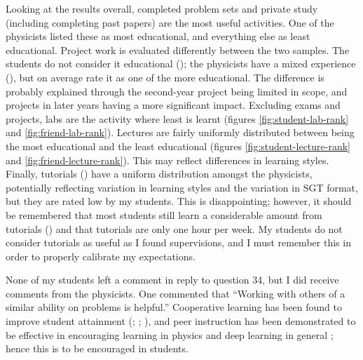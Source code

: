 Looking at the results overall, completed problem sets and private study (including completing past papers) are the most useful activities. One of the physicists listed these as most educational, and everything else as least educational. Project work is evaluated differently between the two samples. The students do not consider it educational (); the physicists have a mixed experience (), but on average rate it as one of the more educational. The difference is probably explained through the second-year project being limited in scope, and projects in later years having a more significant impact. Excluding exams and projects, labs are the activity where least is learnt (figures \ref{fig:student-lab-rank} and \ref{fig:friend-lab-rank}). Lectures are fairly uniformly distributed between being the most educational and the least educational (figures \ref{fig:student-lecture-rank} and \ref{fig:friend-lecture-rank}). This may reflect differences in learning styles. Finally, tutorials () have a uniform distribution amongst the physicists, potentially reflecting variation in learning styles and the variation in SGT format, but they are rated low by my students. This is disappointing; however, it should be remembered that most students still learn a considerable amount from tutorials () and that tutorials are only one hour per week. My students do not consider tutorials as useful as I found supervisions, and I must remember this in order to properly calibrate my expectations.

None of my students left a comment in reply to question 34, but I did receive comments from the physicists. One commented that ``Working with others of a similar ability on problems is helpful.'' Cooperative learning has been found to improve student attainment (\citealt{Qin1995}; \citealt[chapter 2]{Falchikov2001}; \citealt{Cabrera2002}), and peer instruction \citep{Roth1994} has been demonstrated to be effective in encouraging learning in physics \citep{Springer1999,Crouch2001,Pilzer2001,Miller2006} and deep learning in general \citep{Marton1976,Wilson2005}; hence this is to be encouraged in students.

